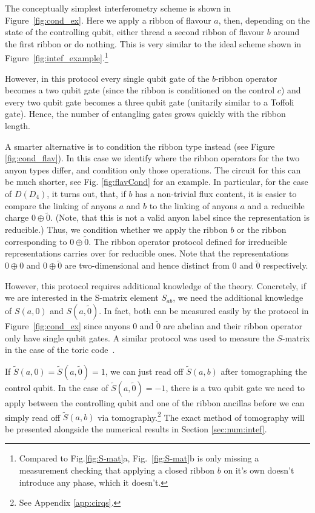 \documentclass[a4paper,twocolumn,11pt]{quantumarticle}
\begin{document}
The conceptually simplest interferometry scheme is shown in Figure~\ref{fig:cond_ex}. Here we apply a ribbon of flavour $a$, then, depending on the state of the controlling qubit, either thread a second ribbon of flavour $b$ around the first ribbon or do nothing. This is very similar to the ideal scheme shown in Figure~\ref{fig:intef_example}.\footnote{Compared to Fig.\ref{fig:S-mat}a, Fig.~\ref{fig:S-mat}b is only missing a measurement checking that applying a closed ribbon $b$ on it's own doesn't introduce any phase, which it doesn't.}

However, in this protocol every single qubit gate of the $b$-ribbon operator becomes a two qubit gate (since the ribbon is conditioned on the control $c$) and every two qubit gate becomes a three qubit gate (unitarily similar to a Toffoli gate). Hence, the number of entangling gates grows quickly with the ribbon length.

A smarter alternative is to condition the ribbon type instead (see Figure \ref{fig:cond_flav}). In this case we identify where the ribbon operators for the two anyon types differ, and condition only those operations. The circuit for this can be much shorter, see Fig. \ref{fig:flavCond} for an example. In particular, for the case of $D(D_4)$, it turns out, that, if $b$ has a non-trivial flux content, it is easier to compare the linking of anyons $a$ and $b$ to the linking of anyons $a$ and a reducible charge $0 \oplus \tilde 0$. (Note, that this is not a valid anyon label since the representation is reducible.) Thus, we condition whether we apply the ribbon $b$ or the ribbon corresponding to $0 \oplus \tilde 0$. The ribbon operator protocol defined for irreducible representations carries over for reducible ones. Note that the representations $0\oplus 0$ and $0 \oplus \tilde 0$ are two-dimensional and hence distinct from $0$ and $\tilde 0$ respectively.

However, this protocol requires additional knowledge of the theory. Concretely, if we are interested in the S-matrix element $S_{ab}$, we need the additional knowledge of  $S(a, 0)$ and $S(a, \tilde{0})$.
In fact, both can be measured easily by the protocol in Figure~\ref{fig:cond_ex} since anyons $0$ and $\tilde{0}$ are abelian and their ribbon operator only have single qubit gates. A similar protocol was used to measure the $S$-matrix in the case of the toric code~\cite{Satzinger_2021}.

If $\tilde S(a, 0) = \tilde S(a, \tilde{0}) = 1$, we can just read off $\tilde S(a,b)$ after tomographing the control qubit.
In the case of $\tilde S(a, \tilde{0}) = -1$, there is a two qubit gate we need to apply between the controlling qubit and one of the ribbon ancillas before we can simply read off $\tilde S(a,b)$ via tomography.\footnote{See Appendix \ref{app:cirqs}.}
The exact method of tomography will be presented alongside the numerical results in Section \ref{sec:num:intef}. 
\end{document}
